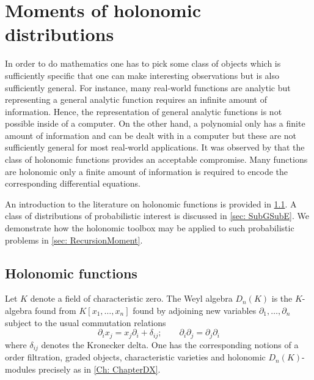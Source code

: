 \chapter{Moments of holonomic distributions}
In order to do mathematics one has to pick some class of objects which is sufficiently specific that one can make interesting observations but is also sufficiently general.
For instance, many real-world functions are analytic but representing a general analytic function requires an infinite amount of information.
Hence, the representation of general analytic functions is not possible inside of a computer.
On the other hand, a polynomial only has a finite amount of information and can be dealt with in a computer but these are not sufficiently general for most real-world applications.
It was observed by \cite{zeilberger1990holonomic} that the class of holonomic functions provides an acceptable compromise.
Many functions are holonomic only a finite amount of information is required to encode the corresponding differential equations.


An introduction to the literature on holonomic functions is provided in \cref{sec: HolAlgorithm}.
A class of distributions of probabilistic interest is discussed in \cref{sec: SubGSubE}.
We demonstrate how the holonomic toolbox may be applied to such probabilistic problems in \cref{sec: RecursionMoment}.
\section{Holonomic functions}\label{sec: HolAlgorithm}
Let $K$ denote a field of characteristic zero.
The Weyl algebra $D_n(K)$ is the $K$-algebra found from $K[x_1,\ldots,x_n]$ found by adjoining new variables $\partial_1,\ldots,\partial_n$ subject to the usual commutation relations
$$\partial_i x_j = x_j \partial_i + \delta_{ij};\qquad \partial_i \partial_j = \partial_j \partial_i $$
where $\delta_{ij}$ denotes the Kronecker delta.
One has the corresponding notions of a order filtration, graded objects, characteristic varieties and holonomic $D_n(K)$-modules precisely as in \cref{Ch: ChapterDX}.

